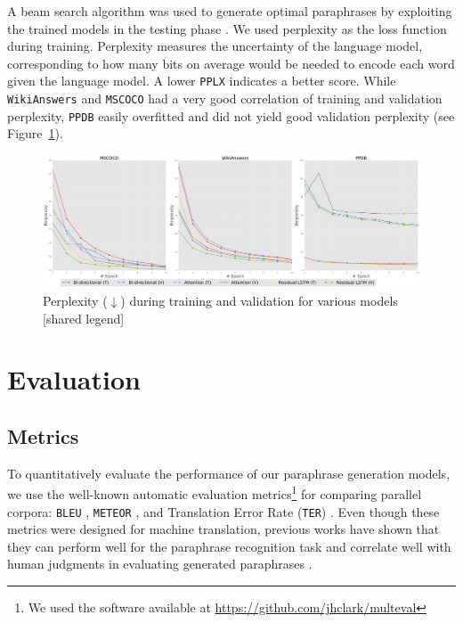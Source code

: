 A beam search algorithm was used to generate optimal paraphrases by exploiting the trained models in the testing phase \cite{SutskeverVL14}. We used perplexity as the loss function during training. Perplexity measures the uncertainty of the language model, corresponding to how many bits on average would be needed to encode each word given the language model. A lower \texttt{PPLX} indicates a better score. While \texttt{WikiAnswers} and \texttt{MSCOCO} had a very good correlation of training and validation perplexity, \texttt{PPDB} easily overfitted and did not yield good validation perplexity (see Figure~\ref{fig:perplex}).
\begin{figure}
    \centering
    \includegraphics[scale=0.20]{figures/paraphrase/plots.pdf}
    \caption[Model Evaluation]{Perplexity ($\downarrow$) during training and validation for various models [shared legend]}
    \label{fig:perplex}
\end{figure}
\section{Evaluation}
\subsection{Metrics}
To quantitatively evaluate the performance of our paraphrase generation models, we use the well-known automatic evaluation metrics\footnote{We used the software available at \url{https://github.com/jhclark/multeval}} for comparing parallel corpora:
\texttt{BLEU} \cite{papineni2002}, \texttt{METEOR}  \cite{Lavie2007}, and Translation Error Rate (\texttt{TER}) \cite{snover2006study}. Even though these metrics were designed for machine translation, previous works have shown that they can perform well for the paraphrase recognition task \cite{Madnani2012} and correlate well with human judgments in evaluating generated paraphrases \cite{Wubben2010}.
 

